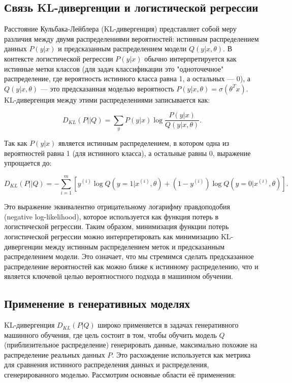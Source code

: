 \subsection*{Связь KL-дивергенции и логистической регрессии}
Расстояние Кульбака-Лейблера (KL-дивергенция) представляет собой меру различия между двумя распределениями вероятностей: истинным распределением данных $P(y|x)$ и предсказанным распределением модели  $Q(y|x, \theta)$. В контексте логистической регрессии $P(y|x)$ обычно интерпретируется как истинные метки классов (для задач классификации это "одноточечное"
распределение, где вероятность истинного класса равна 1, а остальных — 0), а $Q(y|x, \theta)$ — это предсказанная моделью вероятность $P(y|x, \theta) = \sigma(\theta^T x)$. KL-дивергенция между этими распределениями записывается как:

\[
    D_{KL}(P || Q) = \sum_{y} P(y|x) \log \frac{P(y|x)}{Q(y|x, \theta)}.
\]

Так как $P(y|x)$ является истинным распределением, в котором одна из вероятностей равна 1 (для истинного класса), а остальные равны 0, выражение упрощается до:

\[
    D_{KL}(P || Q) = - \sum_{i=1}^m \left[ y^{(i)} \log Q(y=1|x^{(i)}, \theta) + (1 - y^{(i)}) \log Q(y=0|x^{(i)}, \theta) \right].
\]

Это выражение эквивалентно отрицательному логарифму правдоподобия (negative log-likelihood), которое используется как функция потерь в логистической регрессии. Таким образом, минимизация функции потерь логистической регрессии можно интерпретировать как минимизацию KL-дивергенции между истинным распределением меток и предсказанным распределением модели. Это означает, что мы стремимся сделать предсказанное распределение вероятностей как можно ближе к истинному распределению, что и является ключевой целью вероятностного подхода в машинном обучении.


\subsection*{Применение в генеративных моделях}
KL-дивергенция $D_{KL}(P | Q)$ широко применяется в задачах генеративного машинного обучения, где цель состоит в том, чтобы обучить модель $ Q $ (приблизительное распределение) генерировать данные, максимально похожие на распределение реальных данных $P$. Это расхождение используется как метрика для сравнения истинного распределения данных и распределения, сгенерированного моделью. Рассмотрим основные области её применения:

